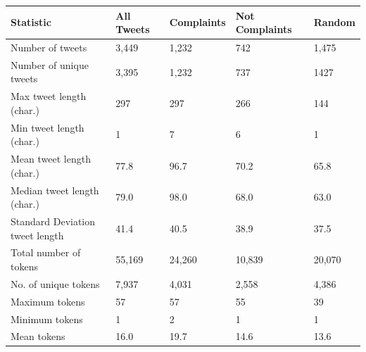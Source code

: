 \begin{table}[htbp]
    \captionsetup{font=small}
    \centering
    \begin{tabularx}{\textwidth}{|l|X|X|X|X|}
        \hline
        \rowcolor[gray]{0.7}
        \textbf{Statistic}              & \textbf{All Tweets} & \textbf{Complaints} & \textbf{Not Complaints} & \textbf{Random} \\
        \hline
        Number of tweets                & 3,449               & 1,232               & 742                     & 1,475           \\
        \rowcolor[gray]{0.9}
        Number of unique tweets         & 3,395               & 1,232               & 737                     & 1427            \\
        \hline
        \hline
        Max tweet length (char.)        & 297                 & 297                 & 266                     & 144             \\
        \rowcolor[gray]{0.9}
        Min tweet length (char.)        & 1                   & 7                   & 6                       & 1               \\
        Mean tweet length (char.)       & 77.8                & 96.7                & 70.2                    & 65.8            \\
        \rowcolor[gray]{0.9}
        Median tweet length (char.)     & 79.0                & 98.0                & 68.0                    & 63.0            \\
        Standard Deviation tweet length & 41.4                & 40.5                & 38.9                    & 37.5            \\
        \hline
        \hline
        Total number of tokens          & 55,169              & 24,260              & 10,839                  & 20,070          \\
        \rowcolor[gray]{0.9}
        No. of unique tokens            & 7,937               & 4,031               & 2,558                   & 4,386           \\
        Maximum tokens                  & 57                  & 57                  & 55                      & 39              \\
        \rowcolor[gray]{0.9}
        Minimum tokens                  & 1                   & 2                   & 1                       & 1               \\
        Mean tokens                     & 16.0                & 19.7                & 14.6                    & 13.6            \\

\end{tabularx}
\end{table}
